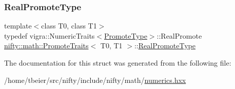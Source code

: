 \mbox{\label{structnifty_1_1math_1_1PromoteTraits_a21f91936d2b9aff18c220bc86529df98}} 
\subsubsection{\texorpdfstring{Real\+Promote\+Type}{RealPromoteType}}
{\footnotesize\ttfamily template$<$class T0, class T1$>$ \\
typedef vigra\+::\+Numeric\+Traits$<$\hyperlink{structnifty_1_1math_1_1PromoteTraits_abcfa7e97456339d61654b607fd8b03f2}{Promote\+Type}$>$\+::Real\+Promote \hyperlink{structnifty_1_1math_1_1PromoteTraits}{nifty\+::math\+::\+Promote\+Traits}$<$ T0, T1 $>$\+::\hyperlink{structnifty_1_1math_1_1PromoteTraits_a21f91936d2b9aff18c220bc86529df98}{Real\+Promote\+Type}}



The documentation for this struct was generated from the following file\+:\begin{DoxyCompactItemize}
\item 
/home/tbeier/src/nifty/include/nifty/math/\hyperlink{numerics_8hxx}{numerics.\+hxx}\end{DoxyCompactItemize}
